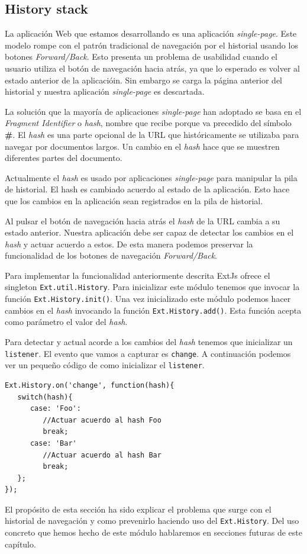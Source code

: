	\subsection{History stack}
		La aplicación Web que estamos desarrollando es una aplicación \emph{single-page}. Este modelo rompe con el patrón tradicional de
		navegación por el historial usando los botones \emph{Forward/Back}. Esto presenta un problema de usabilidad cuando el usuario utiliza
		el botón de navegación hacia atrás, ya que lo esperado es volver al estado anterior de la aplicacióin. Sin embargo se carga la
		página anterior del historial y nuestra aplicación \emph{single-page} es descartada.
		\par
		La solución que la mayoría de aplicaciones \emph{single-page} han adoptado se basa en el \emph{Fragment Identifier}  o \emph{hash},
		nombre que recibe porque va precedido del símbolo \textbf{\#}. El \emph{hash} es una parte opcional de la URL que históricamente se
		utilizaba para navegar por documentos largos. Un cambio en el \emph{hash} hace que se muestren diferentes partes del documento.
		\par
		Actualmente el \emph{hash} es usado por aplicaciones \emph{single-page} para manipular la pila de historial. El hash es cambiado
		acuerdo al estado de la aplicación. Esto hace que los cambios en la aplicación sean registrados en la pila de historial.
		\par
		Al pulsar el botón de navegación hacia atrás el \emph{hash} de la URL cambia a su estado anterior. Nuestra aplicación debe ser capaz
		de detectar los cambios en el \emph{hash} y actuar acuerdo a estos. De esta manera podemos preservar la funcionalidad de los botones
		de navegación \emph{Forward/Back}. 
		\par
		Para implementar la funcionalidad anteriormente descrita ExtJs ofrece el singleton \texttt{Ext.util.History}. Para inicializar este
		módulo tenemos que invocar la función \texttt{Ext.History.init()}. Una vez inicializado este módulo podemos hacer cambios en el
		\emph{hash} invocando la función \texttt{Ext.History.add()}. Esta función acepta como parámetro el valor del \emph{hash}. 
		\par
		Para detectar y actual acorde a los cambios del \emph{hash} tenemos que inicializar un \texttt{listener}. El evento que vamos a
		capturar es \texttt{change}. A continuación podemos ver un pequeño código de como inicializar el \texttt{listener}.
		\begin{lstlisting}[style=myJs]
Ext.History.on('change', function(hash){
   switch(hash){
      case: 'Foo':
         //Actuar acuerdo al hash Foo
         break;
      case: 'Bar'
         //Actuar acuerdo al hash Bar
         break;
   };
});
		\end{lstlisting}
		\par
		El propósito de esta sección ha sido explicar el problema que surge con el historial de navegación y como prevenirlo haciendo uso del
		\texttt{Ext.History}. Del uso concreto que hemos hecho de este módulo hablaremos en secciones futuras de este capítulo.

